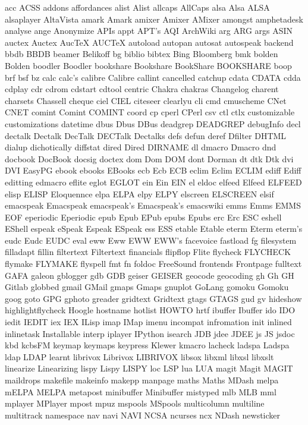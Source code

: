 acc
ACSS
addons
affordances
alist
Alist
allcaps
AllCaps
alsa
Alsa
ALSA
alsaplayer
AltaVista
amark
Amark
amixer
Amixer
AMixer
amongst
amphetadesk
analyse
ange
Anonymize
APIs
appt
APT's
AQI
ArchWiki
arg
ARG
args
ASIN
auctex
Auctex
AucTeX
AUCTeX
autoload
autopan
autosat
autospeak
backend
bbdb
BBDB
beamer
Belikoff
bg
biblio
bibtex
Bing
Bloomberg
bmk
bolden
Bolden
boodler
Boodler
bookshare
Bookshare
BookShare
BOOKSHARE
boop
brf
bsf
bz
calc
calc's
calibre
Calibre
callint
cancelled
catchup
cdata
CDATA
cdda
cdplay
cdr
cdrom
cdstart
cdtool
centric
Chakra
chakras
Changelog
charent
charsets
Chassell
cheque
ciel
CIEL
citeseer
clearlyu
cli
cmd
cmuscheme
CNet
CNET
comint
Comint
COMINT
coord
cp
cperl
CPerl
csv
ctl
ctlx
customizable
customizations
datetime
dbus
Dbus
DBus
deadgrep
DEADGREP
debugInfo
decl
dectalk
Dectalk
DecTalk
DECTalk
Dectalks
defs
defun
deref
Dfilter
DHTML
dialup
dichotically
diffstat
dired
Dired
DIRNAME
dl
dmacro
Dmacro
dnd
docbook
DocBook
docsig
doctex
dom
Dom
DOM
dont
Dorman
dt
dtk
Dtk
dvi
DVI
EasyPG
ebook
ebooks
EBooks
ecb
Ecb
ECB
eclim
Eclim
ECLIM
ediff
Ediff
editting
edmacro
eflite
eglot
EGLOT
ein
Ein
EIN
el
eldoc
elfeed
Elfeed
ELFEED
elisp
ELISP
Eloquennce
elpa
ELPA
elpy
ELPY
elscreen
ELSCREEN
elsif
emacspeak
Emacspeak
emacspeak's
Emacspeak's
emacswiki
emms
Emms
EMMS
EOF
eperiodic
Eperiodic
epub
Epub
EPub
epubs
Epubs
erc
Erc
ESC
eshell
EShell
espeak
eSpeak
Espeak
ESpeak
ess
ESS
etable
Etable
eterm
Eterm
eterm's
eudc
Eudc
EUDC
eval
eww
Eww
EWW
EWW's
facevoice
fastload
fg
filesystem
filladapt
fillin
filtertext
Filtertext
financials
flipflop
Flite
flycheck
FLYCHECK
flymake
FLYMAKE
flyspell
fmt
fn
foldoc
FreeSound
frontends
Frontpage
fulltext
GAFA
galeon
gblogger
gdb
GDB
geiser
GEISER
geocode
geocoding
gh
Gh
GH
Gitlab
globbed
gmail
GMail
gmaps
Gmaps
gnuplot
GoLang
gomoku
Gomoku
goog
goto
GPG
gphoto
greader
gridtext
Gridtext
gtags
GTAGS
gud
gv
hideshow
highlightflycheck
Hoogle
hostname
hotlist
HOWTO
hrtf
ibuffer
Ibuffer
ido
IDO
iedit
IEDIT
iex
IEX
ILisp
imap
IMap
imenu
incompat
infromation
init
inlined
inlinetask
Installable
interp
iplayer
IPython
isearch
JDB
jdee
JDEE
js
JS
jsdoc
kbd
kcbsFM
keymap
keymaps
keypress
Klewer
kmacro
lacheck
ladspa
Ladspa
ldap
LDAP
learnt
librivox
Librivox
LIBRIVOX
libsox
libxml
libxsl
libxslt
linearize
Linearizing
lispy
Lispy
LISPY
loc
LSP
lua
LUA
magit
Magit
MAGIT
maildrops
makefile
makeinfo
makepp
manpage
maths
Maths
MDash
melpa
mELPA
MELPA
metapost
minibuffer
Minibuffer
mistyped
mlb
MLB
mml
mplayer
MPlayer
mpost
mpuz
mspools
MSpools
multicolumn
multiline
multitrack
namespace
nav
navi
NAVI
NCSA
ncurses
ncx
NDash
newsticker
